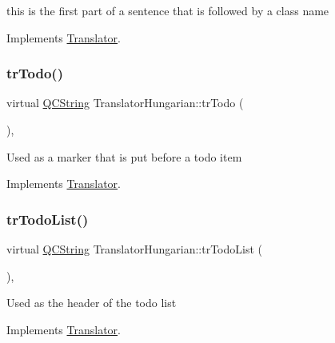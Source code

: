 this is the first part of a sentence that is followed by a class name 

Implements \mbox{\hyperlink{class_translator}{Translator}}.

\mbox{\label{class_translator_hungarian_afa05805083a5a3f0908abdbbf28cac4d}} 
\subsubsection{\texorpdfstring{trTodo()}{trTodo()}}
{\footnotesize\ttfamily virtual \mbox{\hyperlink{class_q_c_string}{Q\+C\+String}} Translator\+Hungarian\+::tr\+Todo (\begin{DoxyParamCaption}{ }\end{DoxyParamCaption})\hspace{0.3cm}{\ttfamily [inline]}, {\ttfamily [virtual]}}

Used as a marker that is put before a todo item 

Implements \mbox{\hyperlink{class_translator}{Translator}}.

\mbox{\label{class_translator_hungarian_a4fa6a4be8d6f56814eeb76e2498de75f}} 
\subsubsection{\texorpdfstring{trTodoList()}{trTodoList()}}
{\footnotesize\ttfamily virtual \mbox{\hyperlink{class_q_c_string}{Q\+C\+String}} Translator\+Hungarian\+::tr\+Todo\+List (\begin{DoxyParamCaption}{ }\end{DoxyParamCaption})\hspace{0.3cm}{\ttfamily [inline]}, {\ttfamily [virtual]}}

Used as the header of the todo list 

Implements \mbox{\hyperlink{class_translator}{Translator}}.

\mbox{\label{class_translator_hungarian_a229d1f2e0446e51bc6ca581779d86a2b}} 
